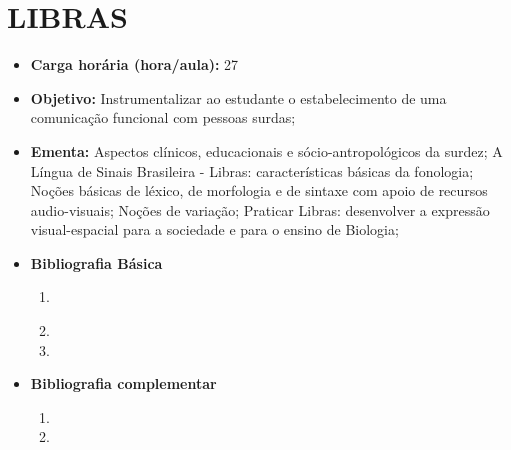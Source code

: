 \documentclass[
	10pt,				%
	openright,			%
	twoside,			%
	a4paper,			%
	english,			%
	french,				%
	brazil,				%
	sumario=tradicional
]{abntex2}
\begin{document}
\section*{LIBRAS}\label{5_libras}
\begin{itemize}
	\item \textbf{Carga horária (hora/aula):} 27
	\item \textbf{Objetivo:} Instrumentalizar ao estudante o estabelecimento de uma comunicação funcional com pessoas surdas;
	\item \textbf{Ementa:} 
	Aspectos clínicos, educacionais e sócio-antropológicos da surdez; 
	A Língua de Sinais Brasileira -	Libras: características básicas da fonologia;
	Noções básicas de léxico, de morfologia e de sintaxe com apoio de recursos audio-visuais; 
	Noções de variação; 
	Praticar Libras: desenvolver a expressão visual-espacial para a sociedade e para o ensino de Biologia;
	\item \textbf{Bibliografia Básica}
	\begin{enumerate}
		\item \cite{cartilha2012}
		\item 
		\item 
	\end{enumerate}
	\item \textbf{Bibliografia complementar}
	\begin{enumerate}
		\item 
		\item
	\end{enumerate}
\end{itemize}


\newpage
\end{document}
